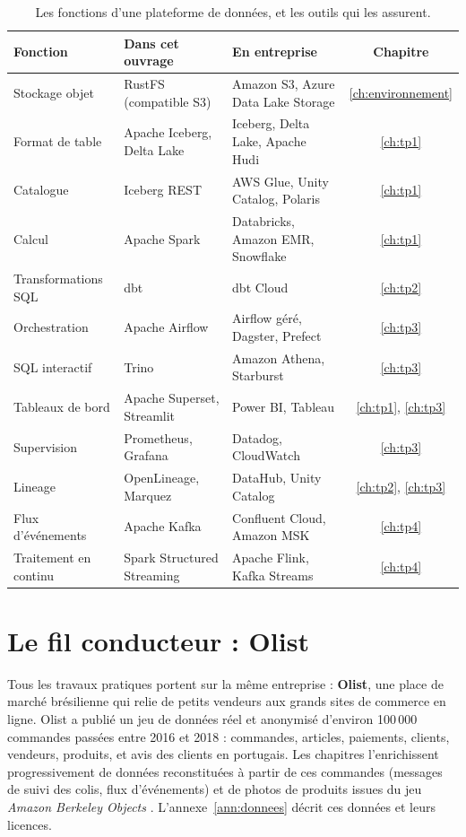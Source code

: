 \begin{table}[H]
\centering\small
\renewcommand{\arraystretch}{1.28}
\begin{tabularx}{\textwidth}{@{}>{\raggedright\arraybackslash}p{3.4cm} >{\raggedright\arraybackslash}X >{\raggedright\arraybackslash}X c@{}}
\toprule
\textbf{Fonction} & \textbf{Dans cet ouvrage} & \textbf{En entreprise} & \textbf{Chapitre} \\
\midrule
Stockage objet & RustFS (compatible S3) & Amazon S3, Azure Data Lake Storage & \ref{ch:environnement} \\
Format de table & Apache Iceberg, Delta Lake & Iceberg, Delta Lake, Apache Hudi & \ref{ch:tp1} \\
Catalogue & Iceberg REST & AWS Glue, Unity Catalog, Polaris & \ref{ch:tp1} \\
Calcul & Apache Spark & Databricks, Amazon EMR, Snowflake & \ref{ch:tp1} \\
Transformations SQL & dbt & dbt Cloud & \ref{ch:tp2} \\
Orchestration & Apache Airflow & Airflow géré, Dagster, Prefect & \ref{ch:tp3} \\
SQL interactif & Trino & Amazon Athena, Starburst & \ref{ch:tp3} \\
Tableaux de bord & Apache Superset, Streamlit & Power BI, Tableau & \ref{ch:tp1}, \ref{ch:tp3} \\
Supervision & Prometheus, Grafana & Datadog, CloudWatch & \ref{ch:tp3} \\
Lineage & OpenLineage, Marquez & DataHub, Unity Catalog & \ref{ch:tp2}, \ref{ch:tp3} \\
Flux d'événements & Apache Kafka & Confluent Cloud, Amazon MSK & \ref{ch:tp4} \\
Traitement en continu & Spark Structured Streaming & Apache Flink, Kafka Streams & \ref{ch:tp4} \\
\bottomrule
\end{tabularx}
\caption{Les fonctions d'une plateforme de données, et les outils qui les assurent.}
\label{tab:c1-outils}
\end{table}

\section{Le fil conducteur : Olist}

Tous les travaux pratiques portent sur la même entreprise : \textbf{Olist}, une place
de marché brésilienne qui relie de petits vendeurs aux grands sites de commerce en ligne. Olist a
publié un jeu de données réel et anonymisé d'environ 100\,000 commandes passées entre 2016 et 2018
\citep{olist2018} : commandes, articles, paiements, clients, vendeurs, produits, et avis des clients
en portugais. Les chapitres l'enrichissent progressivement de données reconstituées à partir de
ces commandes (messages de suivi des colis, flux d'événements) et de photos de produits issues du
jeu \emph{Amazon Berkeley Objects} \citep{collins2022}. L'annexe~\ref{ann:donnees} décrit ces
données et leurs licences.

